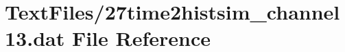 \hypertarget{27time2histsim__channel13_8dat}{}\section{Text\+Files/27time2histsim\+\_\+channel13.dat File Reference}
\label{27time2histsim__channel13_8dat}

